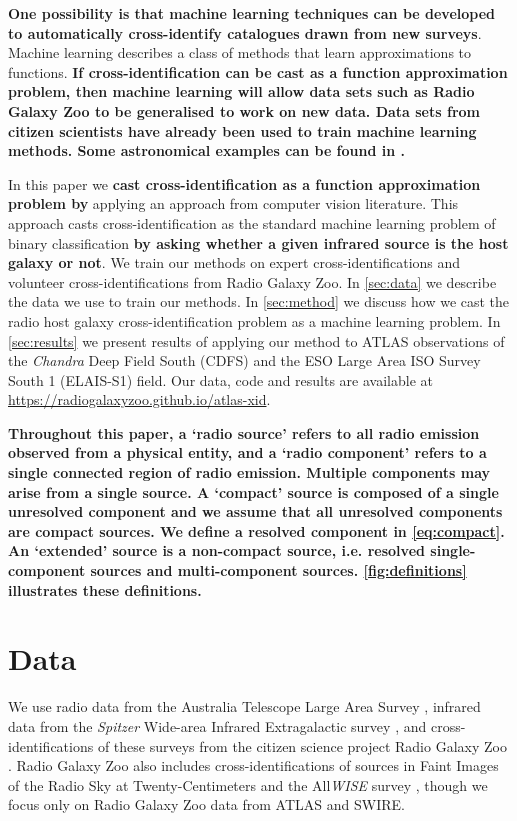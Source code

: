 \documentclass[fleqn,usenatbib,usedcolumn]{mnras}
\newcommand{\edited}[1]{{\bf {#1}}}
\begin{document}
  \edited{One possibility is that machine learning techniques can
  be developed to automatically cross-identify catalogues drawn from new surveys}. Machine learning
  describes a class of methods that learn approximations to functions. \edited{If
  cross-identification can be cast as a function approximation problem, then machine learning will allow data
  sets such as Radio Galaxy Zoo to be generalised to work on new data. Data sets from
  citizen scientists have already been used to train machine learning methods.
  Some astronomical examples can be found in \citet{marshall15citizenscience}.}

  In this paper we \edited{cast cross-identification as a function
  approximation problem by} applying an approach from computer vision
  literature. This approach casts cross-identification as the standard machine
  learning problem of binary classification \edited{by asking whether a given
  infrared source is the host galaxy or not}. We train our methods on expert
  cross-identifications and volunteer cross-identifications from Radio Galaxy Zoo. In
  \autoref{sec:data} we describe the data we use to train our methods. In
  \autoref{sec:method} we discuss how we cast the radio host galaxy
  cross-identification problem as a machine learning problem. In
  \autoref{sec:results} we present results of applying our method to ATLAS
  observations of the \emph{Chandra} Deep Field South (CDFS) and the ESO Large Area ISO Survey South 1 (ELAIS-S1) field. Our data, code and results are
  available at \url{https://radiogalaxyzoo.github.io/atlas-xid}.

  \edited{Throughout this paper, a `radio source' refers to all radio emission observed from
  a physical entity, and a `radio component' refers to a single connected
  region of radio emission. Multiple components may arise from a single
  source. A `compact' source is composed of a \edited{single unresolved component} and we
  assume that all unresolved components are compact sources. \edited{We define a resolved component in \autoref{eq:compact}.} An `extended'
  source is a non-compact source, i.e. resolved single-component sources and
  multi-component sources. \autoref{fig:definitions} illustrates these definitions.}

\section{Data}\label{sec:data}

  We use radio data from the Australia Telescope Large Area Survey
  \citep[ATLAS;][]{norris06,franzen15}, infrared data from the \emph{Spitzer}
  Wide-area Infrared Extragalactic survey \citep[SWIRE;][]{lonsdale03swire,
  surace05swire}, and cross-identifications of these surveys from the citizen
  science project Radio Galaxy Zoo \citep{banfield15}. Radio Galaxy Zoo also
  includes cross-identifications of sources in Faint Images of the Radio Sky at
  Twenty-Centimeters \citep[FIRST;][]{white97first} and the All\emph{WISE}
  survey \citep{cutri2013wiseexplanatory}, though we focus only on Radio
  Galaxy Zoo data from ATLAS and SWIRE.
\end{document}
